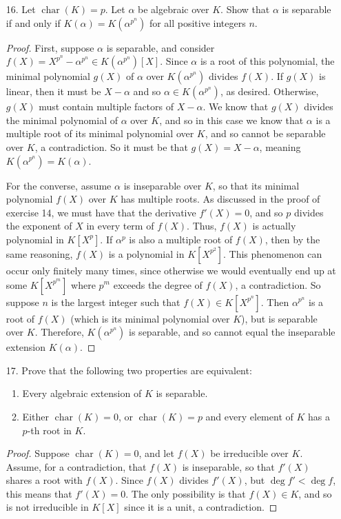 \documentclass[10pt]{article}
\DeclareMathOperator*{\Char}{char}
\begin{document}
\begin{enumerate}
\item[16.] Let $\Char(K)  = p$.  Let $\alpha$ be algebraic over $K$.  Show that $\alpha$ is separable if and only if $K(\alpha) = K(\alpha^{p^n})$ for all positive integers $n$.

\begin{proof}
First, suppose $\alpha$ is separable, and consider $f(X) = X^{p^n} - \alpha^{p^n} \in K(\alpha^{p^n})[X]$.  Since $\alpha$ is a root of this polynomial, the minimal polynomial $g(X)$ of $\alpha$ over $K(\alpha^{p^n})$ divides $f(X)$.  If $g(X)$ is linear, then it must be $X - \alpha$ and so $\alpha \in K(\alpha^{p^n})$, as desired.  Otherwise, $g(X)$ must contain multiple factors of $X - \alpha$.  We know that $g(X)$ divides the minimal polynomial of $\alpha$ over $K$, and so in this case we know that $\alpha$ is a multiple root of its minimal polynomial over $K$, and so cannot be separable over $K$, a contradiction.  So it must be that $g(X) = X - \alpha$, meaning $K(\alpha^{p^n}) = K(\alpha)$.

For the converse, assume $\alpha$ is inseparable over $K$, so that its minimal polynomial $f(X)$ over $K$ has multiple roots.  As discussed in the proof of exercise 14, we must have that the derivative $f'(X) = 0$, and so $p$ divides the exponent of $X$ in every term of $f(X)$.  Thus, $f(X)$ is actually polynomial in $K[X^p]$.  If $\alpha^p$ is also a multiple root of $f(X)$, then by the same reasoning, $f(X)$ is a polynomial in $K[X^{p^2}]$.  This phenomenon can occur only finitely many times, since otherwise we would eventually end up at some $K[X^{p^m}]$ where $p^m$ exceeds the degree of $f(X)$, a contradiction.  So suppose $n$ is the largest integer such that $f(X) \in K[X^{p^n}]$.  Then $\alpha^{p^n}$ is a root of $f(X)$ (which is its minimal polynomial over $K$), but is separable over $K$.  Therefore, $K(\alpha^{p^n})$ is separable, and so cannot equal the inseparable extension $K(\alpha)$.
\end{proof}


\pagebreak
\item[17.] Prove that the following two properties are equivalent:
\begin{enumerate}
\item Every algebraic extension of $K$ is separable.
\item Either $\Char(K)  = 0$, or $\Char(K)  = p$ and every element of $K$ has a $p$-th root in $K$.
\end{enumerate}

\begin{proof}
Suppose $\Char(K) = 0$, and let $f(X)$ be irreducible over $K$.  Assume, for a contradiction, that $f(X)$ is inseparable, so that $f'(X)$ shares a root with $f(X)$.  Since $f(X)$ divides $f'(X)$, but $\deg f' < \deg f$, this means that $f'(X) = 0$.  The only possibility is that $f(X) \in K$, and so is not irreducible in $K[X]$ since it is a unit, a contradiction.


\end{proof}
\end{enumerate}
\end{document}
